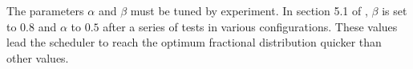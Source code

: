 The parameters $\alpha$ and $\beta$ must be tuned by experiment. In section 5.1 of \cite{singh2013mprtp}, $\beta$ is set to $0.8$ and $\alpha$ to $0.5$ after a series of tests in various configurations. These values lead the scheduler to reach the optimum fractional distribution quicker than other values.